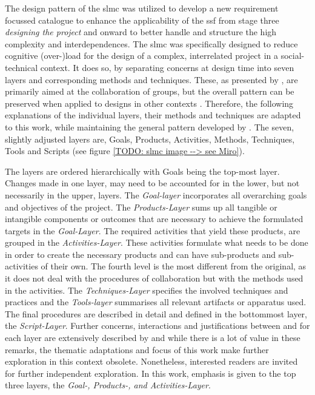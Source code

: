 The design pattern of the \acrshort{slmc} was utilized to develop a new requirement focussed catalogue to enhance the applicability of the \acrshort{ssf} from stage three \textit{designing the project} and onward to better handle and structure the high complexity and interdependences. The \acrshort{slmc} was specifically designed to reduce cognitive (over-)load for the design of a complex, interrelated project in a social-technical context. It does so, by separating concerns at design time into seven layers and corresponding methods and techniques. These, as presented by \autocite{briggsSevenLayerModelCollaboration}, are primarily aimed at the collaboration of groups, but the overall pattern can be preserved when applied to designs in other contexts \autocite{diggelenGroundedDesignDesign2009}. Therefore, the following explanations of the individual layers, their methods and techniques are adapted to this work, while maintaining the general pattern developed by \autocite{briggsSevenLayerModelCollaboration}. The seven, slightly adjusted layers are, Goals, Products, Activities, Methods, Techniques, Tools and Scripts (see figure \ref{TODO: slmc image --> see Miro}). 


The layers are ordered hierarchically with Goals being the top-most layer. Changes made in one layer, may need to be accounted for in the lower, but not necessarily in the upper, layers. The \textit{Goal-layer} incorporates all overarching goals and objectives of the project. The \textit{Products-Layer} sums up all tangible or intangible components or outcomes that are necessary to achieve the formulated targets in the \textit{Goal-Layer}. The required activities that yield these products, are grouped in the \textit{Activities-Layer}. These activities formulate what needs to be done in order to create the necessary products and can have sub-products and sub-activities of their own. The fourth level is the most different from the original, as it does not deal with the procedures of collaboration but with the methods used in the activities. The \textit{Techniques-Layer} specifies the involved techniques and practices and the \textit{Tools-layer} summarises all relevant artifacts or apparatus used. The final procedures are described in detail and defined in the bottommost layer, the \textit{Script-Layer}. Further concerns, interactions and justifications between and for each layer are extensively described by \autocite{briggsSevenLayerModelCollaboration} and while there is a lot of value in these remarks, the thematic adaptations and focus of this work make further exploration in this context obsolete. Nonetheless, interested readers are invited for further independent exploration. In this work, emphasis is given to the top three layers, the \textit{Goal-, Products-, and Activities-Layer}.

